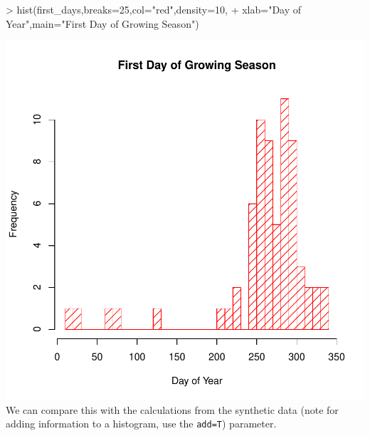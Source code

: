\documentclass{article}
\begin{document}
\begin{Schunk}
\begin{Sinput}
> hist(first_days,breaks=25,col="red",density=10,
+      xlab="Day of Year",main="First Day of Growing Season")
\end{Sinput}
\end{Schunk}
\includegraphics{climate_vignette-027}
We can compare this with the calculations from the synthetic data
(note for adding information to a histogram, use the {\tt add=T})
parameter.
\end{document}
